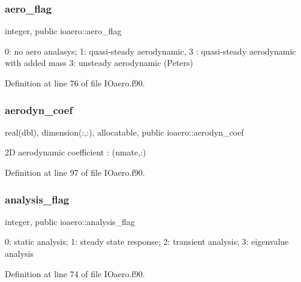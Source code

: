 \subsubsection{\texorpdfstring{aero\+\_\+flag}{aero\_flag}}
{\footnotesize\ttfamily integer, public ioaero\+::aero\+\_\+flag}



0\+: no aero analasys; 1\+: quasi-\/steady aerodynamic, 3 \+: quasi-\/steady aerodynamic with added mass 3\+: unsteady aerodynamic (Peters) 



Definition at line 76 of file I\+Oaero.\+f90.

\mbox{\label{namespaceioaero_a116b30aa43f6d871e7d4a3ed6f4428c3}} 
\subsubsection{\texorpdfstring{aerodyn\+\_\+coef}{aerodyn\_coef}}
{\footnotesize\ttfamily real(dbl), dimension(\+:,\+:), allocatable, public ioaero\+::aerodyn\+\_\+coef}



2D aerodynamic coefficient \+: (nmate,\+:) 



Definition at line 97 of file I\+Oaero.\+f90.

\mbox{\label{namespaceioaero_a435527b09d62e7aac9883e1a6d6f3438}} 
\subsubsection{\texorpdfstring{analysis\+\_\+flag}{analysis\_flag}}
{\footnotesize\ttfamily integer, public ioaero\+::analysis\+\_\+flag}



0\+: static analysis; 1\+: steady state response; 2\+: transient analysis; 3\+: eigenvalue analysis 



Definition at line 74 of file I\+Oaero.\+f90.

\mbox{\label{namespaceioaero_a02839259538f3d7e305ebe79cb43d2c4}} 
